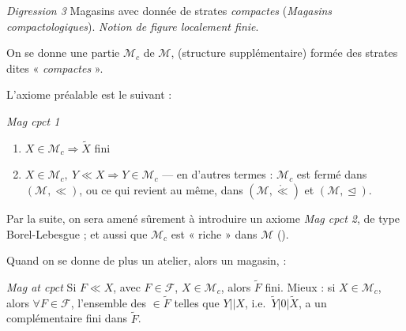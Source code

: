 \documentclass[11pt,a4paper]{article}
\begin{document}
\textit{Digression 3} \quad Magasins avec donnée de strates  \textit{compactes} (\textit{Magasins compactologiques}).
\textit{Notion de figure localement finie}.

On se donne une partie $\mathcal{M}_c$ de $\mathcal{M}$, \add{\ill{}} \struck{\ill{}} (structure supplémentaire) formée des strates dites  « \textit{compactes} ».

 L'axiome préalable est le suivant :

\textit{Mag cpct 1} \quad {}
\begin{enumerate}
  \item[a)] $X\in\mathcal{M}_c\Longrightarrow\widetilde{X}$ fini
  \item[b)] $X\in\mathcal{M}_c,\ Y\ll X\Longrightarrow Y\in\mathcal{M}_c$ — en d'autres termes : $\mathcal{M}_c$ est fermé dans $(\mathcal{M},\ll)$, ou ce qui revient au même, dans $(\mathcal{M},\mathring{\ll})$ et $(\mathcal{M},\trianglelefteq)$.
\end{enumerate}

Par la suite, on sera amené sûrement à introduire un axiome \textit{Mag cpct 2}, de type Borel-Lebesgue ; et aussi que $\mathcal{M}_c$ est « riche » dans $\mathcal{M}$ ().

Quand on se donne de plus un  atelier, alors  un magasin,  :


\textit{Mag at cpct} \quad Si $F\ll X$, avec $F\in\mathcal{F}$, $X\in\mathcal{M}_c$, alors $\widetilde{F}$ fini. Mieux : si $X\in\mathcal{M}_c$, alors $\forall F\in\mathcal{F}$, l'ensemble des   $\in\widetilde{F}$ telles que  $Y\mathbin{||}X$, i.e.\ $\widetilde{Y}\mathbin{|0|}\widetilde{X}$, a un complémentaire fini dans $\widetilde{F}$.


\end{document}
